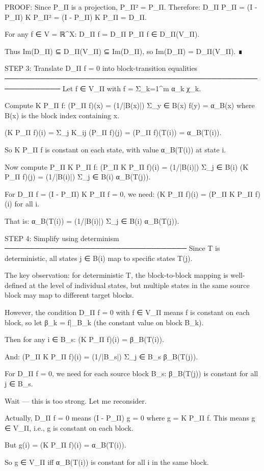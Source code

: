 PROOF: Since P_Π is a projection, P_Π² = P_Π.
Therefore:
D_Π P_Π = (I - P_Π) K P_Π² = (I - P_Π) K P_Π = D_Π.

For any f ∈ V = ℝ^X:
D_Π f = D_Π P_Π f ∈ D_Π(V_Π).

Thus Im(D_Π) ⊆ D_Π(V_Π) ⊆ Im(D_Π), so Im(D_Π) = D_Π(V_Π). ∎

STEP 3: Translate D_Π f = 0 into block-transition equalities
─────────────────────────────────────────────────────────────
Let f ∈ V_Π with f = Σ_{k=1}^m α_k χ_k.

Compute K P_Π f:
(P_Π f)(x) = (1/|B(x)|) Σ_{y ∈ B(x)} f(y) = α_{B(x)}
where B(x) is the block index containing x.

(K P_Π f)(i) = Σ_j K_{ij} (P_Π f)(j) = (P_Π f)(T(i)) = α_{B(T(i))}.

So K P_Π f is constant on each state, with value α_{B(T(i))} at state i.

Now compute P_Π K P_Π f:
(P_Π K P_Π f)(i) = (1/|B(i)|) Σ_{j ∈ B(i)} (K P_Π f)(j)
= (1/|B(i)|) Σ_{j ∈ B(i)} α_{B(T(j))}.

For D_Π f = (I - P_Π) K P_Π f = 0, we need:
(K P_Π f)(i) = (P_Π K P_Π f)(i) for all i.

That is:
α_{B(T(i))} = (1/|B(i)|) Σ_{j ∈ B(i)} α_{B(T(j))}.

STEP 4: Simplify using determinism
────────────────────────────────────
Since T is deterministic, all states j ∈ B(i) map to specific states T(j).

The key observation: for deterministic T, the block-to-block mapping is
well-defined at the level of individual states, but multiple states in the
same source block may map to different target blocks.

However, the condition D_Π f = 0 with f ∈ V_Π means f is constant on each
block, so let β_k = f|_{B_k} (the constant value on block B_k).

Then for any i ∈ B_s:
(K P_Π f)(i) = β_{B(T(i))}.

And:
(P_Π K P_Π f)(i) = (1/|B_s|) Σ_{j ∈ B_s} β_{B(T(j))}.

For D_Π f = 0, we need for each source block B_s:
β_{B(T(j))} is constant for all j ∈ B_s.

Wait — this is too strong. Let me reconsider.

Actually, D_Π f = 0 means (I - P_Π) g = 0 where g = K P_Π f.
This means g ∈ V_Π, i.e., g is constant on each block.

But g(i) = (K P_Π f)(i) = α_{B(T(i))}.

So g ∈ V_Π iff α_{B(T(i))} is constant for all i in the same block.

